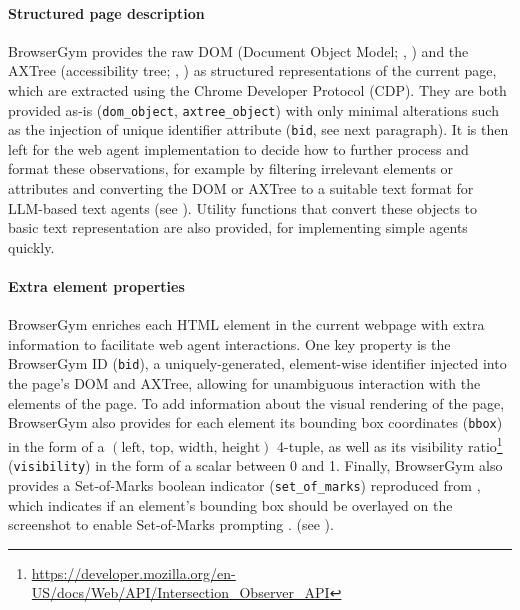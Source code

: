 \documentclass[10pt]{article} %
\begin{document}
\paragraph{Structured page description} BrowserGym provides the raw DOM (Document Object Model; \citeauthor{whatwg_dom}, \citeyear{whatwg_dom}) and the AXTree (accessibility tree; \citeauthor{core_aam_1.1}, \citeyear{core_aam_1.1}) as structured representations of the current page, which are extracted using the Chrome Developer Protocol (CDP). They are both provided as-is (\texttt{dom\_object}, \texttt{axtree\_object}) with only minimal alterations such as the injection of unique identifier attribute (\texttt{bid}, see next paragraph). It is then left for the web agent implementation to decide how to further process and format these observations, for example by filtering irrelevant elements or attributes and converting the DOM or AXTree to a suitable text format for LLM-based text agents (see ). Utility functions that convert these objects to basic text representation are also provided, for implementing simple agents quickly.

\paragraph{Extra element properties} BrowserGym enriches each HTML element in the current webpage with extra information to facilitate web agent interactions. One key property is the BrowserGym ID (\texttt{bid}), a uniquely-generated, element-wise identifier injected into the page's DOM and AXTree, allowing for unambiguous interaction with the elements of the page. To add information about the visual rendering of the page, BrowserGym also provides for each element its bounding box coordinates (\texttt{bbox}) in the form of a $(\text{left, top, width, height})$ 4-tuple, as well as its visibility ratio\footnote{\url{https://developer.mozilla.org/en-US/docs/Web/API/Intersection_Observer_API}} (\texttt{visibility}) in the form of a scalar between 0 and 1. Finally, BrowserGym also provides a Set-of-Marks boolean indicator (\texttt{set\_of\_marks}) reproduced from \citet{web-voyager}, which indicates if an element's bounding box should be overlayed on the screenshot to enable Set-of-Marks prompting \citep{yang2023som,web-voyager}. (see ).
\end{document}
